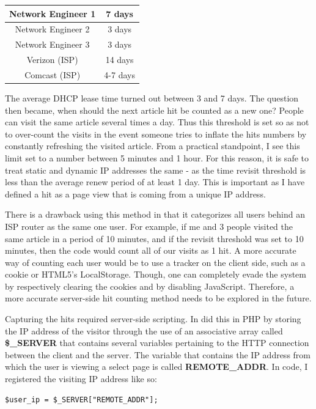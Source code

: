 \documentclass[12pt]{article}
\begin{document}
\begin{tabular}{| c | c |}
  \hline                       
  Network Engineer 1 & 7 days \\[1ex] \hline
  Network Engineer 2 & 3 days \\[1ex] \hline
  Network Engineer 3 & 3 days \\ [1ex] \hline
  Verizon (ISP) & 14 days \\[1ex] \hline
  Comcast (ISP) & 4-7 days \\[1ex]
  \hline  
\end{tabular}
\vspace{0.3in}

The average DHCP lease time turned out between 3 and 7 days. The question then became, when should the next article hit be counted as a new one? People can visit the same article several times a day. Thus this threshold is set so as not to over-count the visits in the event someone tries to inflate the hits numbers by constantly refreshing the visited article. From a practical standpoint, I see this limit set to a number between 5 minutes and 1 hour. For this reason, it is safe to treat static and dynamic IP addresses the same - as the time revisit threshold is less than the average renew period of at least 1 day. This is important as I have defined a hit as a page view that is coming from a unique IP address.

\noindent There is a drawback using this method in that it categorizes all users behind an ISP router as the same one user. For example, if me and 3 people visited the same article in a period of 10 minutes, and if the revisit threshold was set to 10 minutes, then the code would count all of our visits as 1 hit. A more accurate way of counting each user would be to use a tracker on the client side, such as a cookie or HTML5's LocalStorage. Though, one can completely evade the system by respectively clearing the cookies and by disabling JavaScript. Therefore, a more accurate server-side hit counting method needs to be explored in the future.  

Capturing the hits required server-side scripting. In did this in PHP by storing the IP address of the visitor through the use of an associative array called \textbf{\$\_SERVER} that contains several variables pertaining to the HTTP connection between the client and the server. The variable that contains the IP address from which the user is viewing a select page is called \textbf{REMOTE\_ADDR}. In code, I registered the visiting IP address like so:
\begin{lstlisting}
$user_ip = $_SERVER["REMOTE_ADDR"];
\end{lstlisting}
\end{document}
